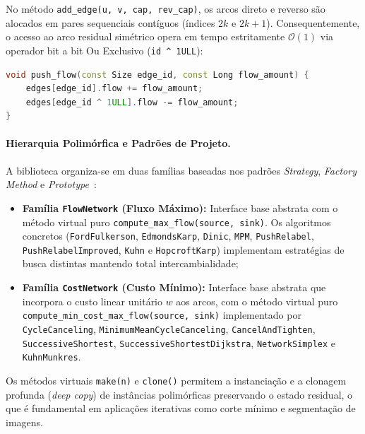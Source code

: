 No método \lstinline{add_edge(u, v, cap, rev_cap)}, os arcos direto e reverso são alocados em pares sequenciais contíguos (índices $2k$ e $2k+1$). Consequentemente, o acesso ao arco residual simétrico opera em tempo estritamente $\mathcal{O}(1)$ via operador bit a bit Ou Exclusivo (\lstinline{id ^ 1ULL}):
\begin{lstlisting}[language=C++, numbers=none, basicstyle=\ttfamily\footnotesize, frame=none, backgroundcolor=\color{white}]
void push_flow(const Size edge_id, const Long flow_amount) {
    edges[edge_id].flow += flow_amount;
    edges[edge_id ^ 1ULL].flow -= flow_amount;
}
\end{lstlisting}

\paragraph{Hierarquia Polimórfica e Padrões de Projeto.}
A biblioteca organiza-se em duas famílias baseadas nos padrões \textit{Strategy}, \textit{Factory Method} e \textit{Prototype}~\cite{gamma1994design}:
\begin{itemize}
    \item \textbf{Família \lstinline{FlowNetwork} (Fluxo Máximo):} Interface base abstrata com o método virtual puro \lstinline{compute_max_flow(source, sink)}. Os algoritmos concretos (\lstinline{FordFulkerson}, \lstinline{EdmondsKarp}, \lstinline{Dinic}, \lstinline{MPM}, \lstinline{PushRelabel}, \lstinline{PushRelabelImproved}, \lstinline{Kuhn} e \lstinline{HopcroftKarp}) implementam estratégias de busca distintas mantendo total intercambialidade;
    \item \textbf{Família \lstinline{CostNetwork} (Custo Mínimo):} Interface base abstrata que incorpora o custo linear unitário $w$ aos arcos, com o método virtual puro \lstinline{compute_min_cost_max_flow(source, sink)} implementado por \lstinline{CycleCanceling}, \lstinline{MinimumMeanCycleCanceling}, \lstinline{CancelAndTighten}, \lstinline{SuccessiveShortest}, \lstinline{SuccessiveShortestDijkstra}, \lstinline{NetworkSimplex} e \lstinline{KuhnMunkres}.
\end{itemize}

Os métodos virtuais \lstinline{make(n)} e \lstinline{clone()} permitem a instanciação e a clonagem profunda (\textit{deep copy}) de instâncias polimórficas preservando o estado residual, o que é fundamental em aplicações iterativas como corte mínimo e segmentação de imagens.
